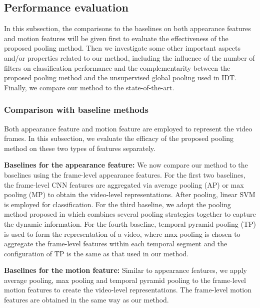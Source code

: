 \documentclass[journal]{IEEEtran}
\begin{document}
\subsection{Performance evaluation}
In this subsection, the comparisons to the baselines on both appearance features and motion features will be given first to evaluate the effectiveness of the proposed pooling method. Then we investigate some other important aspects and/or properties related to our method, including the influence of the number of filters on classification performance and the complementarity between the proposed pooling method and the unsupervised global pooling used in IDT. Finally, we compare our method to the state-of-the-art.

\subsubsection{Comparison with baseline methods}
Both appearance feature and motion feature are employed to represent the video frames. In this subsection, we evaluate the efficacy of the proposed pooling method on these two types of features separately.

\noindent \textbf{Baselines for the appearance feature:} We now compare our method to the baselines using the frame-level appearance features. For the first two baselines, the frame-level CNN features are aggregated via average pooling (AP) or max pooling (MP) to obtain the video-level representations. After pooling, linear SVM \cite{REF08a} is employed for classification. For the third baseline, we adopt the pooling method proposed in \cite{Ryoo_2015_CVPR} which combines several pooling strategies together to capture the dynamic information. For the fourth baseline, temporal pyramid pooling (TP) is used to form the representation of a video, where max pooling is chosen to aggregate the frame-level features within each temporal segment and the configuration of TP is the same as that used in our method.

\noindent \textbf{Baselines for the motion feature:} Similar to appearance features, we apply average pooling, max pooling and temporal pyramid pooling to the frame-level motion features to create the video-level representations. The frame-level motion features are obtained in the same way as our method.
\end{document}
